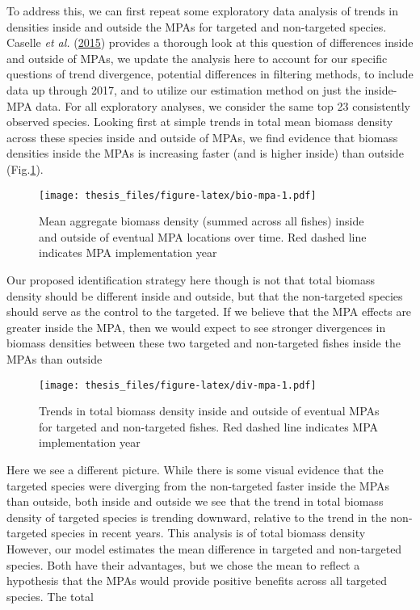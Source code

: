 \documentclass[twoside,12pt,final]{ucthesis-CA2012}
\begin{document}
\begin{ucmainmatter}
To address this, we can first repeat some exploratory data analysis of
trends in densities inside and outside the MPAs for targeted and
non-targeted species. Caselle \emph{et al.}
(\protect\hyperlink{ref-Caselle2015}{2015}) provides a thorough look at
this question of differences inside and outside of MPAs, we update the
analysis here to account for our specific questions of trend divergence,
potential differences in filtering methods, to include data up through
2017, and to utilize our estimation method on just the inside-MPA data.
For all exploratory analyses, we consider the same top 23 consistently
observed species. Looking first at simple trends in total mean biomass
density across these species inside and outside of MPAs, we find
evidence that biomass densities inside the MPAs is increasing faster
(and is higher inside) than outside (Fig.\ref{fig:bio-mpa}).
\begin{figure}
\centering
\texttt{[image: thesis\_files/figure-latex/bio-mpa-1.pdf]}
\caption{\label{fig:bio-mpa}Mean aggregate biomass density (summed across
all fishes) inside and outside of eventual MPA locations over time. Red
dashed line indicates MPA implementation year}
\end{figure}
Our proposed identification strategy here though is not that total
biomass density should be different inside and outside, but that the
non-targeted species should serve as the control to the targeted. If we
believe that the MPA effects are greater inside the MPA, then we would
expect to see stronger divergences in biomass densities between these
two targeted and non-targeted fishes inside the MPAs than outside
\begin{figure}
\centering
\texttt{[image: thesis\_files/figure-latex/div-mpa-1.pdf]}
\caption{\label{fig:div-mpa}Trends in total biomass density inside and
outside of eventual MPAs for targeted and non-targeted fishes. Red
dashed line indicates MPA implementation year}
\end{figure}
Here we see a different picture. While there is some visual evidence
that the targeted species were diverging from the non-targeted faster
inside the MPAs than outside, both inside and outside we see that the
trend in total biomass density of targeted species is trending downward,
relative to the trend in the non-targeted species in recent years. This
analysis is of total biomass density However, our model estimates the
mean difference in targeted and non-targeted species. Both have their
advantages, but we chose the mean to reflect a hypothesis that the MPAs
would provide positive benefits across all targeted species. The total

\end{ucmainmatter}
\end{document}

